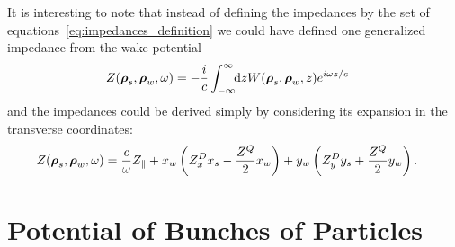     It is interesting to note that instead of defining the impedances by the set of equations~\eqref{eq:impedances_definition} we could have defined one generalized impedance from the wake potential
    \begin{align}\label{eq:generalized_impedance_definition}
            Z(\boldsymbol{\rho}_s, \boldsymbol{\rho}_w, \omega) &= -\frac{i}{c} \int_{-\infty}^{\infty}\!\!\text{d}z W(\boldsymbol{\rho}_s, \boldsymbol{\rho}_w, z)e^{i\omega z/c}
    \end{align}
    and the impedances could be derived simply by considering its expansion in the transverse coordinates:
    \begin{align}
        Z(\boldsymbol{\rho}_s, \boldsymbol{\rho}_w, \omega) &=
	  		\frac{c}{\omega}Z_\parallel +
			x_w\left(Z^D_xx_s - \frac{Z^Q}{2}x_w\right) +
			y_w\left(Z^D_yy_s + \frac{Z^Q}{2}y_w\right).
    \end{align}

\section{Potential of Bunches of Particles}\label{sec:potential_of_bunch}


